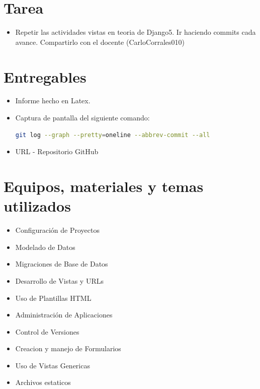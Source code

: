 \documentclass{article}
\begin{document}
 
	\section{Tarea}
  \begin{itemize}
    \item Repetir las actividades vistas en teoria de Django5.  Ir haciendo commits cada avance.  Compartirlo con el docente (CarloCorrales010)
  \end{itemize}
  
 
  \section{Entregables}
  \begin{itemize}
    \item Informe hecho en Latex.
    \item Captura de pantalla del siguiente comando:
    \begin{lstlisting}[language=bash]
      git log --graph --pretty=oneline --abbrev-commit --all
    \end{lstlisting}
    \item URL - Repositorio GitHub
  \end{itemize}
  
		
	\section{Equipos, materiales y temas utilizados}
  \begin{itemize}
    \item Configuración de Proyectos
    \item Modelado de Datos
    \item Migraciones de Base de Datos
    \item Desarrollo de Vistas y URLs
    \item Uso de Plantillas HTML
    \item Administración de Aplicaciones
    \item Control de Versiones
    \item Creacion y manejo de Formularios
    \item Uso de Vistas Genericas
    \item Archivos estaticos
  \end{itemize}
\end{document}
